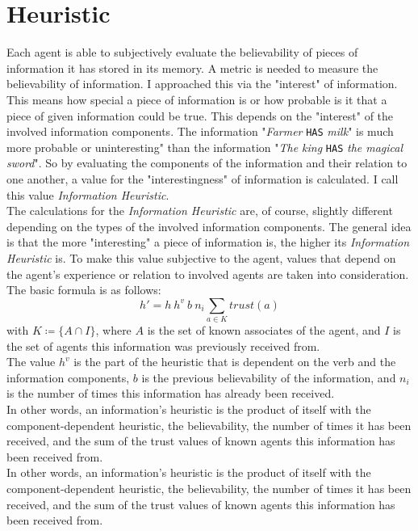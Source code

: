 \section{Heuristic}
\label{section:heuristic}
Each agent is able to subjectively evaluate the believability of pieces of information it has stored in its memory. A metric is needed to measure the believability of information. I approached this via the "interest" of information. This means how special a piece of information is or how probable is it that a piece of given information could be true. This depends on the "interest" of the involved information components. The information "\textit{Farmer} \verb|HAS| \textit{milk}" is much more probable or uninteresting" than the information "\textit{The king} \verb|HAS| \textit{the magical sword}". So by evaluating the components of the information and their relation to one another, a value for the "interestingness" of information is calculated. I call this value \textit{Information Heuristic}.\\
The calculations for the \textit{Information Heuristic} are, of course, slightly different depending on the types of the involved information components. The general idea is that the more "interesting" a piece of information is, the higher its \textit{Information Heuristic} is. To make this value subjective to the agent, values that depend on the agent's experience or relation to involved agents are taken into consideration.\\
The basic formula is as follows:
\begin{equation}
	h' = h\ h^{v}\ b\ n_i\sum_{a \in K}trust(a)
\end{equation}
with $K \coloneqq \{A \cap I\}$, where $A$ is the set of known associates of the agent, and $I$ is the set of agents this information was previously received from.\\
The value $h^{v}$ is the part of the heuristic that is dependent on the verb and the information components, $b$ is the previous believability of the information, and $n_i$ is the number of times this information has already been received.\\
In other words, an information's heuristic is the product of itself with the component-dependent heuristic, the believability, the number of times it has been received, and the sum of the trust values of known agents this information has been received from. \\
In other words, an information’s heuristic is the product of itself with the component-dependent heuristic, the believability, the number of times it has been received, and the sum of the trust values of known agents this information has been received from.\\

